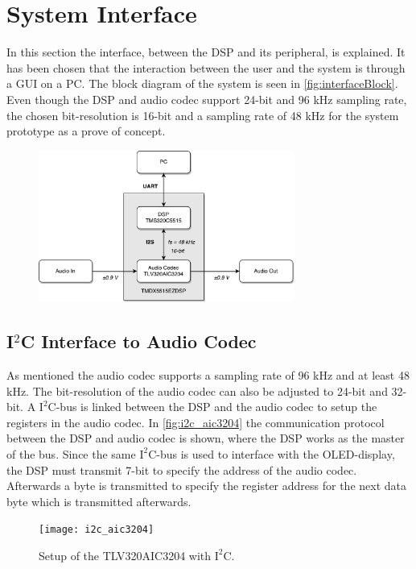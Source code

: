 \section{System Interface}

In this section the interface, between the DSP and its peripheral, is explained. It has been chosen that the interaction between the user and the system is through a GUI on a PC. The block diagram of the system is seen in \autoref{fig:interfaceBlock}. Even though the DSP and audio codec support 24-bit and 96 kHz sampling rate, the chosen bit-resolution is 16-bit and a sampling rate of 48 kHz for the system prototype as a prove of concept.

\begin{figure}[H]
\centering
\includegraphics[width=0.75\textwidth]{figures/interfaceBlock.pdf}
\caption{}
\label{fig:interfaceBlock}
\end{figure}
\subsection*{I$^2$C Interface to Audio Codec}

As mentioned the audio codec supports a sampling rate of 96 kHz and at least 48 kHz. The bit-resolution of the audio codec can also be adjusted to 24-bit and 32-bit. A $\text{I}^2$C-bus is linked between the DSP and the audio codec to setup the registers in the audio codec. In \autoref{fig:i2c_aic3204} the communication protocol between the DSP and audio codec is shown, where the DSP works as the master of the bus. Since the same $\text{I}^2$C-bus is used to interface with the OLED-display, the DSP must transmit 7-bit to specify the address of the audio codec. Afterwards a byte is transmitted to specify the register address for the next data byte which is transmitted afterwards.

\begin{figure}[H]
\centering
\texttt{[image: i2c\_aic3204]}
\caption{Setup of the TLV320AIC3204 with $\text{I}^2$C.}
\label{fig:i2c_aic3204}
\end{figure}  

